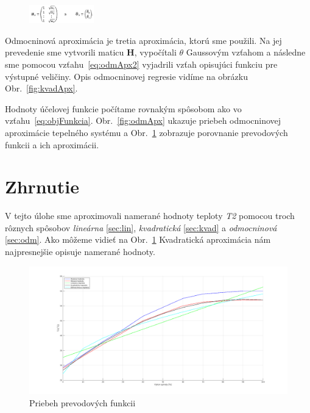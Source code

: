 \documentclass{article}
\begin{document}
\begin{figure}[!htbp]
	\begin{center}
		\includegraphics[width=0.25\textwidth]{include/defHandTheta3.png}
	\end{center}
\end{figure}

Odmocninová aproximácia je tretia aproximácia, ktorú sme použili.
Na jej prevedenie sme vytvorili maticu \textbf{H}, vypočítali
\(\theta\) Gaussovým vzťahom a následne sme pomocou vzťahu~\ref{eq:odmApx2}
vyjadrili vzťah opisujúci funkciu pre výstupné veličiny. Opis odmocninovej
regresie vidíme na obrázku Obr.~\ref{fig:kvadApx}.

Hodnoty účelovej funkcie počítame rovnakým spôsobom ako vo vzťahu~\ref{eq:objFunkcia}.
Obr.~\ref{fig:odmApx} ukazuje priebeh odmocninovej aproximácie tepelného systému a
Obr.~\ref{fig:prevod} zobrazuje porovnanie prevodových funkcii a ich aproximácii.

\clearpage

\section{Zhrnutie}
\label{sec:zhrnutie}

V tejto úlohe sme aproximovali namerané hodnoty teploty \textit{T2} pomocou troch rôznych spôsobov
\textit{lineárna} \ref{sec:lin}, \textit{kvadratická} \ref{sec:kvad} a \textit{odmocninová} \ref{sec:odm}.
Ako môžeme vidieť na Obr.~\ref{fig:prevod} Kvadratická aproximácia nám najpresnejšie opisuje namerané hodnoty.

\begin{figure}[!htbp]
	\begin{center}
		\includegraphics[width=\textwidth]{./include/prevodove_funkcie2.png}
		\caption{Priebeh prevodových funkcii}
		\label{fig:prevod}
	\end{center}
	\hfill
\end{figure}
\end{document}
